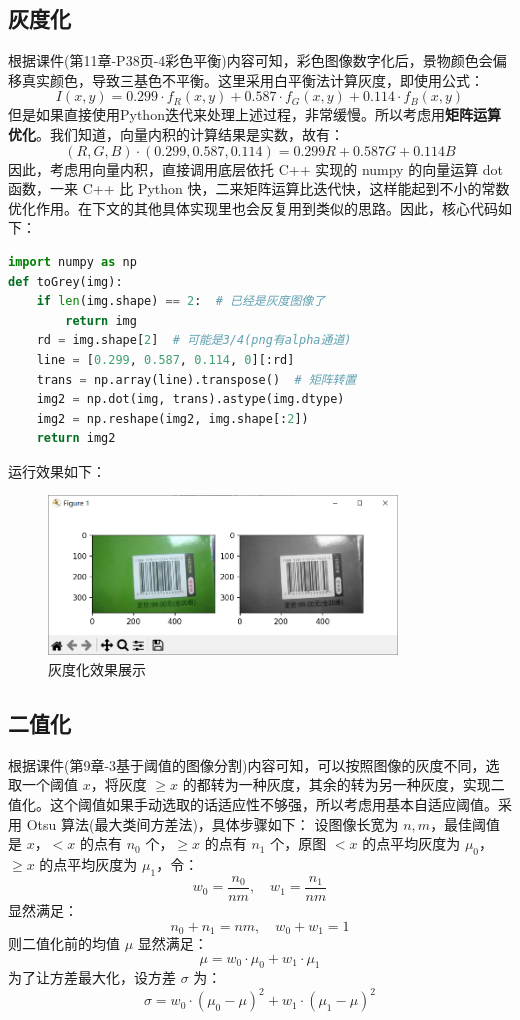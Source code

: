 \documentclass{ctexart}
\begin{document}
\subsection{灰度化}
根据课件(第11章-P38页-4彩色平衡)内容可知，彩色图像数字化后，景物颜色会偏移真实颜色，导致三基色不平衡。这里采用白平衡法计算灰度，即使用公式：%
\[I(x,y)=0.299\cdot f_R(x,y)+0.587\cdot f_G(x,y)+0.114\cdot f_B(x,y)\] %
但是如果直接使用Python迭代来处理上述过程，非常缓慢。所以考虑用\textbf{矩阵运算优化}。我们知道，向量内积的计算结果是实数，故有：
\[(R,G,B)\cdot(0.299,0.587,0.114)=0.299R+0.587G+0.114B\]
因此，考虑用向量内积，直接调用底层依托 C++ 实现的 numpy 的向量运算 dot 函数，一来 C++ 比 Python 快，二来矩阵运算比迭代快，这样能起到不小的常数优化作用。在下文的其他具体实现里也会反复用到类似的思路。因此，核心代码如下：
\begin{lstlisting}[language=python]
import numpy as np
def toGrey(img):
    if len(img.shape) == 2:  # 已经是灰度图像了
        return img
    rd = img.shape[2]  # 可能是3/4(png有alpha通道)
    line = [0.299, 0.587, 0.114, 0][:rd]
    trans = np.array(line).transpose()  # 矩阵转置
    img2 = np.dot(img, trans).astype(img.dtype)
    img2 = np.reshape(img2, img.shape[:2])
    return img2
\end{lstlisting}
运行效果如下：
\begin{figure}[htbp]
    \centering
    \includegraphics[height=120pt]{sample_toGrey}
    \caption{灰度化效果展示}
\end{figure}


\subsection{二值化}
根据课件(第9章-3基于阈值的图像分割)内容可知，可以按照图像的灰度不同，选取一个阈值 $x$，将灰度 $\ge x$ 的都转为一种灰度，其余的转为另一种灰度，实现二值化。这个阈值如果手动选取的话适应性不够强，所以考虑用基本自适应阈值。采用 Otsu 算法(最大类间方差法)，具体步骤如下：
设图像长宽为 $n,m$，最佳阈值是 $x$，$< x$ 的点有 $n_0$ 个，$\ge x$ 的点有 $n_1$ 个，原图 $< x$ 的点平均灰度为 $\mu_0$，$\ge x$ 的点平均灰度为 $\mu_1$，令：
\[w_0=\frac{n_0}{nm},\quad w_1=\frac{n_1}{nm}\]
显然满足：
\[n_0+n_1=nm,\quad w_0+w_1=1\]
则二值化前的均值 $\mu$ 显然满足：
\[\mu=w_0\cdot\mu_0+w_1\cdot\mu_1\]
为了让方差最大化，设方差 $\sigma$ 为：
\[\sigma=w_0\cdot(\mu_0-\mu)^2+w_1\cdot(\mu_1-\mu)^2\]
\end{document}
